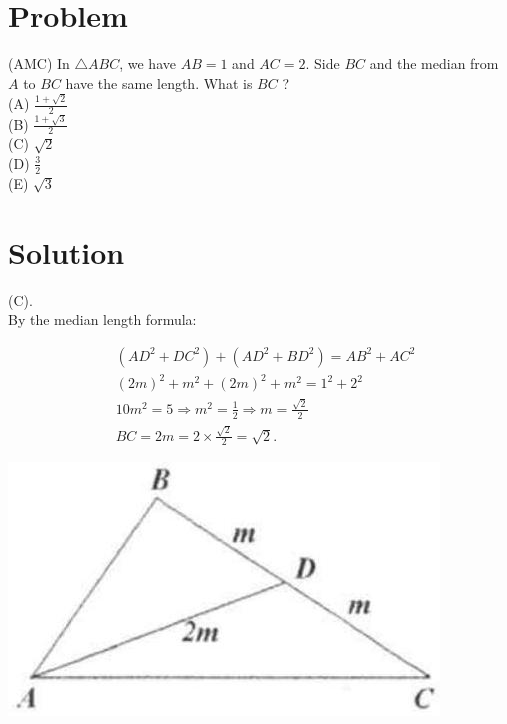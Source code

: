 \documentclass{article}
\begin{document}
\section*{Problem}
(AMC) In \(\triangle A B C\), we have \(A B=1\) and \(A C=2\). Side \(B C\) and the median from \(A\) to \(B C\) have the same length. What is \(B C\) ?\\
(A) \(\frac{1+\sqrt{2}}{2}\)\\
(B) \(\frac{1+\sqrt{3}}{2}\)\\
(C) \(\sqrt{2}\)\\
(D) \(\frac{3}{2}\)\\
(E) \(\sqrt{3}\)

\section*{Solution}
(C).\\
By the median length formula:

\[
\begin{aligned}
& \left(A D^{2}+D C^{2}\right)+\left(A D^{2}+B D^{2}\right)=A B^{2}+A C^{2} \\
& (2 m)^{2}+m^{2}+(2 m)^{2}+m^{2}=1^{2}+2^{2} \\
& 10 m^{2}=5 \Rightarrow m^{2}=\frac{1}{2} \Rightarrow m=\frac{\sqrt{2}}{2} \\
& B C=2 m=2 \times \frac{\sqrt{2}}{2}=\sqrt{2} .
\end{aligned}
\]

\begin{center}
\includegraphics[width=\textwidth]{images/031(2).jpg}
\end{center}
\end{document}
